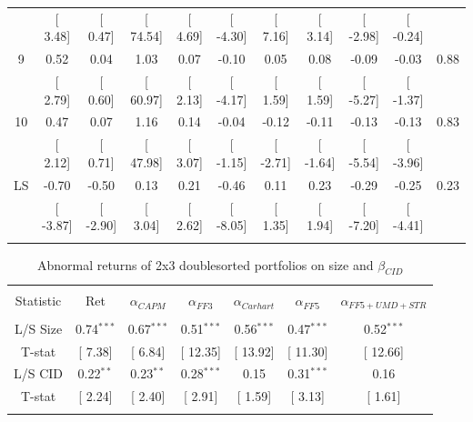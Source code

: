 \documentclass[16pt]{article}
\begin{document}
\begin{table}[!htbp]
\begin{tabular}{@{\extracolsep{0pt}} ccccccccccc}
 & [ 3.48] & [ 0.47] & [ 74.54] & [ 4.69] & [ -4.30] & [ 7.16] & [ 3.14] & [ -2.98] & [ -0.24] &  \\ 
9 & 0.52 & 0.04 & 1.03 & 0.07 & -0.10 & 0.05 & 0.08 & -0.09 & -0.03 & 0.88 \\ 
 & [ 2.79] & [ 0.60] & [ 60.97] & [ 2.13] & [ -4.17] & [ 1.59] & [ 1.59] & [ -5.27] & [ -1.37] &  \\ 
10 & 0.47 & 0.07 & 1.16 & 0.14 & -0.04 & -0.12 & -0.11 & -0.13 & -0.13 & 0.83 \\ 
 & [ 2.12] & [ 0.71] & [ 47.98] & [ 3.07] & [ -1.15] & [ -2.71] & [ -1.64] & [ -5.54] & [ -3.96] &  \\ 
LS & -0.70 & -0.50 & 0.13 & 0.21 & -0.46 & 0.11 & 0.23 & -0.29 & -0.25 & 0.23 \\ 
 & [ -3.87] & [ -2.90] & [ 3.04] & [ 2.62] & [ -8.05] & [ 1.35] & [ 1.94] & [ -7.20] & [ -4.41] &  \\ 
\hline \\[-1.8ex] 
\end{tabular} 
\end{table} 



\begin{table}[!htbp] \centering 
  \caption{Abnormal returns of 2x3 doublesorted portfolios on size and $\beta_{CID}$} 
  \label{} 
\begin{tabular}{@{\extracolsep{5pt}} ccccccc} 
\\[-1.8ex]\hline 
\hline \\[-1.8ex] 
Statistic & Ret & $\alpha_{CAPM}$ & $\alpha_{FF3}$ & $\alpha_{Carhart}$ & $\alpha_{FF5}$ & $\alpha_{FF5+UMD+STR}$ \\ 
\hline \\[-1.8ex] 
L/S Size & 0.74$^{***}$ & 0.67$^{***}$ & 0.51$^{***}$ & 0.56$^{***}$ & 0.47$^{***}$ & 0.52$^{***}$ \\ 
T-stat & [ 7.38] & [ 6.84] & [ 12.35] & [ 13.92] & [ 11.30] & [ 12.66] \\ 
L/S CID & 0.22$^{**}$ & 0.23$^{**}$ & 0.28$^{***}$ & 0.15 & 0.31$^{***}$ & 0.16 \\ 
T-stat & [ 2.24] & [ 2.40] & [ 2.91] & [ 1.59] & [ 3.13] & [ 1.61] \\ 
\hline \\[-1.8ex] 
\end{tabular} 
\end{table}
\end{document}
